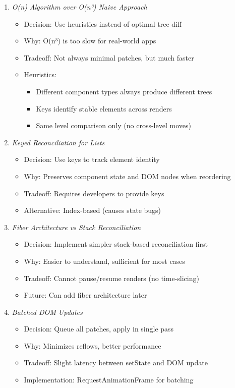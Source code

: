 \documentclass[11pt]{article}
\begin{document}
\begin{enumerate}
\item \emph{O(n) Algorithm over O(n³) Naive Approach}

\begin{itemize}
\item Decision: Use heuristics instead of optimal tree diff
\item Why: O(n³) is too slow for real-world apps
\item Tradeoff: Not always minimal patches, but much faster
\item Heuristics:
\begin{itemize}
\item Different component types always produce different trees
\item Keys identify stable elements across renders
\item Same level comparison only (no cross-level moves)
\end{itemize}
\end{itemize}

\item \emph{Keyed Reconciliation for Lists}

\begin{itemize}
\item Decision: Use keys to track element identity
\item Why: Preserves component state and DOM nodes when reordering
\item Tradeoff: Requires developers to provide keys
\item Alternative: Index-based (causes state bugs)
\end{itemize}

\item \emph{Fiber Architecture vs Stack Reconciliation}

\begin{itemize}
\item Decision: Implement simpler stack-based reconciliation first
\item Why: Easier to understand, sufficient for most cases
\item Tradeoff: Cannot pause/resume renders (no time-slicing)
\item Future: Can add fiber architecture later
\end{itemize}

\item \emph{Batched DOM Updates}

\begin{itemize}
\item Decision: Queue all patches, apply in single pass
\item Why: Minimizes reflows, better performance
\item Tradeoff: Slight latency between setState and DOM update
\item Implementation: RequestAnimationFrame for batching
\end{itemize}
\end{enumerate}
\end{document}
